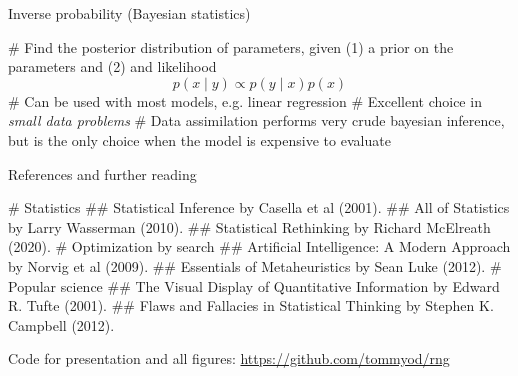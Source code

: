\documentclass[12pt, aspectratio=149]{beamer}
\theoremstyle{plain}
\begin{document}
\begin{frame}[fragile]{Inverse probability (Bayesian statistics)}
	\begin{easylist}[itemize]
		# Find the posterior distribution of parameters, given (1)
		a prior on the parameters and (2) and likelihood
		\begin{equation*}
		p(x \mid y) \propto p(y \mid x) p(x)
		\end{equation*}
		# Can be used with most models, e.g. linear regression
		# Excellent choice in \emph{small data problems}
		# Data assimilation performs very crude 
		bayesian inference, but is the only choice when the model is expensive to evaluate
	\end{easylist}
\end{frame}



\begin{frame}[fragile]{References and further reading}
\scriptsize
\begin{easylist}[itemize]
# Statistics
## Statistical Inference by Casella et al (2001).
## All of Statistics by Larry Wasserman (2010).
## Statistical Rethinking by Richard McElreath (2020).
# Optimization by search
## Artificial Intelligence: A Modern Approach by Norvig et al (2009).
## Essentials of Metaheuristics by Sean Luke (2012).
# Popular science
## The Visual Display of Quantitative Information by Edward R. Tufte (2001).
## Flaws and Fallacies in Statistical Thinking by Stephen K. Campbell (2012).
\end{easylist}
\normalsize
\begin{center}
Code for presentation and all figures: { \href{https://github.com/tommyod/rng}{https://github.com/tommyod/rng}}
\end{center}
\end{frame}
\end{document}
